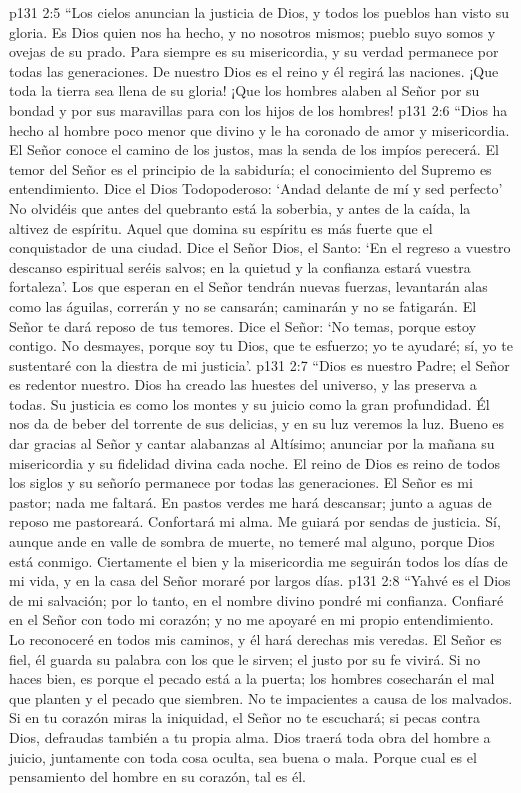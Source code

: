 \vs p131 2:5 “Los cielos anuncian la justicia de Dios, y todos los pueblos han visto su gloria. Es Dios quien nos ha hecho, y no nosotros mismos; pueblo suyo somos y ovejas de su prado. Para siempre es su misericordia, y su verdad permanece por todas las generaciones. De nuestro Dios es el reino y él regirá las naciones. ¡Que toda la tierra sea llena de su gloria! ¡Que los hombres alaben al Señor por su bondad y por sus maravillas para con los hijos de los hombres!
\vs p131 2:6 “Dios ha hecho al hombre poco menor que divino y le ha coronado de amor y misericordia. El Señor conoce el camino de los justos, mas la senda de los impíos perecerá. El temor del Señor es el principio de la sabiduría; el conocimiento del Supremo es entendimiento. Dice el Dios Todopoderoso: ‘Andad delante de mí y sed perfecto’ No olvidéis que antes del quebranto está la soberbia, y antes de la caída, la altivez de espíritu. Aquel que domina su espíritu es más fuerte que el conquistador de una ciudad. Dice el Señor Dios, el Santo: ‘En el regreso a vuestro descanso espiritual seréis salvos; en la quietud y la confianza estará vuestra fortaleza'. Los que esperan en el Señor tendrán nuevas fuerzas, levantarán alas como las águilas, correrán y no se cansarán; caminarán y no se fatigarán. El Señor te dará reposo de tus temores. Dice el Señor: ‘No temas, porque estoy contigo. No desmayes, porque soy tu Dios, que te esfuerzo; yo te ayudaré; sí, yo te sustentaré con la diestra de mi justicia'.
\vs p131 2:7 “Dios es nuestro Padre; el Señor es redentor nuestro. Dios ha creado las huestes del universo, y las preserva a todas. Su justicia es como los montes y su juicio como la gran profundidad. Él nos da de beber del torrente de sus delicias, y en su luz veremos la luz. Bueno es dar gracias al Señor y cantar alabanzas al Altísimo; anunciar por la mañana su misericordia y su fidelidad divina cada noche. El reino de Dios es reino de todos los siglos y su señorío permanece por todas las generaciones. El Señor es mi pastor; nada me faltará. En pastos verdes me hará descansar; junto a aguas de reposo me pastoreará. Confortará mi alma. Me guiará por sendas de justicia. Sí, aunque ande en valle de sombra de muerte, no temeré mal alguno, porque Dios está conmigo. Ciertamente el bien y la misericordia me seguirán todos los días de mi vida, y en la casa del Señor moraré por largos días.
\vs p131 2:8 “Yahvé es el Dios de mi salvación; por lo tanto, en el nombre divino pondré mi confianza. Confiaré en el Señor con todo mi corazón; y no me apoyaré en mi propio entendimiento. Lo reconoceré en todos mis caminos, y él hará derechas mis veredas. El Señor es fiel, él guarda su palabra con los que le sirven; el justo por su fe vivirá. Si no haces bien, es porque el pecado está a la puerta; los hombres cosecharán el mal que planten y el pecado que siembren. No te impacientes a causa de los malvados. Si en tu corazón miras la iniquidad, el Señor no te escuchará; si pecas contra Dios, defraudas también a tu propia alma. Dios traerá toda obra del hombre a juicio, juntamente con toda cosa oculta, sea buena o mala. Porque cual es el pensamiento del hombre en su corazón, tal es él.

